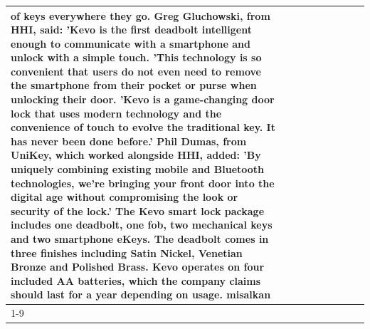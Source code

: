 \begin{table}[H]
\begin{tabular}{lllrlllll}
of keys everywhere they go. Greg Gluchowski, from HHI, said: 'Kevo is the first deadbolt intelligent enough to communicate with a smartphone and unlock with a simple touch. 'This technology is so convenient that users do not even need to remove the smartphone from their pocket or purse when unlocking their door. 'Kevo is a game-changing door lock that uses modern technology and the convenience of touch to evolve the traditional key. It has never been done before.' Phil Dumas, from UniKey, which worked alongside HHI, added: 'By uniquely combining existing mobile and Bluetooth technologies, we’re bringing your front door into the digital age without compromising the look or security of the lock.' The Kevo smart lock package includes one deadbolt, one fob, two mechanical keys and two smartphone eKeys. The deadbolt comes in three finishes including Satin Nickel, Venetian Bronze and Polished Brass. Kevo operates on four included AA batteries, which the company claims should last for a year depending on usage. misalkan \\
\cline{1-9}
\bottomrule
\end{tabular}
\end{table}
